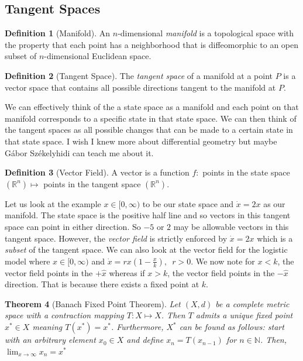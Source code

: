 \documentclass{article}
\newtheorem{theorem}{Theorem}[section]
\theoremstyle{definition}
\newtheorem{definition}[theorem]{Definition}
\begin{document}
\subsection{Tangent Spaces}
\begin{definition}[Manifold]
    An $n$-dimensional \emph{manifold} is a topological space with the property that each point has a neighborhood that is diffeomorphic to an open subset of $n$-dimensional Euclidean space.
\end{definition}
\begin{definition}[Tangent Space]
    The \emph{tangent space} of a manifold at a point $P$ is a vector space that contains all possible directions tangent to the manifold at $P$.
\end{definition}
We can effectively think of the a state space as a manifold and each point on that manifold corresponds to a specific state in that state space. We can then think of the tangent spaces as all possible changes that can be made to a certain state in that state space. I wish I knew more about differential geometry but maybe G\'abor Sz\'ekelyhidi can teach me about it. 
\begin{definition}[Vector Field]
    A vector is a function $f:$ points in the state space $(\mathbb{R}^n)\mapsto$ points in the tangent space $(\mathbb{R}^n)$. 
\end{definition}
Let us look at the example $x\in[0,\infty)$ to be our state space and $\dot x=2x$ as our manifold. The state space is the positive half line and so vectors in this tangent space can point in either direction. So $-5$ or $2$ may be allowable vectors in this tangent space. However, the \emph{vector field} is strictly enforced by $\dot x=2x$ which is a \emph{subset} of the tangent space. We can also look at the vector field for the logistic model where $x\in [0,\infty)$ and $\dot x=rx\left(1-\frac{x}{k}\right),\,\,\, r>0$. We now note for $x<k$, the vector field points in the $+\hat x$ whereas if $x>k$, the vector field points in the $-\hat x$ direction. That is because there exists a fixed point at $k$.
\begin{theorem}[Banach Fixed Point Theorem]
    Let $(X,d)$ be a \emph{complete} metric space with a contraction mapping $T:X\mapsto X$. Then $T$ admits a unique fixed point $x^* \in X$ meaning $T(x^*)=x^*$. Furthermore, $X^*$ can be found as follows: start with an arbitrary element $x_0\in X$ and define $x_n = T(x_{n-1})$ for $n\in \mathbb{N}$. Then, $\lim_{x\rightarrow \infty} x_n=x^*$
\end{theorem}
\end{document}
